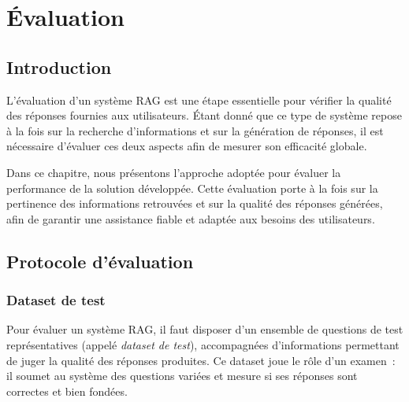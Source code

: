 
\chapter{Évaluation}
\label{chap:evaluation}

\section*{Introduction}

L’évaluation d’un système RAG est une étape essentielle pour vérifier la qualité des réponses fournies aux utilisateurs. Étant donné que ce type de système repose à la fois sur la recherche d’informations et sur la génération de réponses, il est nécessaire d’évaluer ces deux aspects afin de mesurer son efficacité globale.

Dans ce chapitre, nous présentons l’approche adoptée pour évaluer la performance de la solution développée. Cette évaluation porte à la fois sur la pertinence des informations retrouvées et sur la qualité des réponses générées, afin de garantir une assistance fiable et adaptée aux besoins des utilisateurs.

\section{Protocole d'évaluation}

\subsection{Dataset de test}

Pour évaluer un système RAG, il faut disposer d'un ensemble de questions de test représentatives (appelé \textit{dataset de test}), accompagnées d'informations permettant de juger la qualité des réponses produites. Ce dataset joue le rôle d'un examen~: il soumet au système des questions variées et mesure si ses réponses sont correctes et bien fondées.


